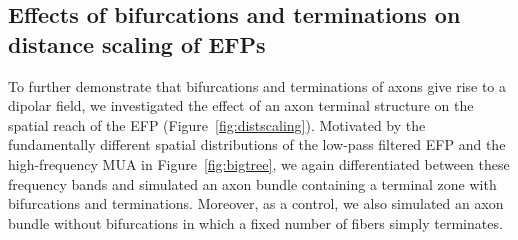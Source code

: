 \documentclass[]{elife}
\begin{document}
\subsection{Effects of bifurcations and terminations on distance scaling
of
EFPs}\label{effects-of-bifurcations-and-terminations-on-distance-scaling-of-efps}

To further demonstrate that bifurcations and terminations of axons give
rise to a dipolar field, we investigated the effect of an axon terminal
structure on the spatial reach of the EFP
(Figure~\ref{fig:distscaling}). Motivated by the fundamentally different
spatial distributions of the low-pass filtered EFP and the
high-frequency MUA in Figure~\ref{fig:bigtree}, we again differentiated
between these frequency bands and simulated an axon bundle containing a
terminal zone with bifurcations and terminations. Moreover, as a
control, we also simulated an axon bundle without bifurcations in which
a fixed number of fibers simply terminates.
\end{document}
